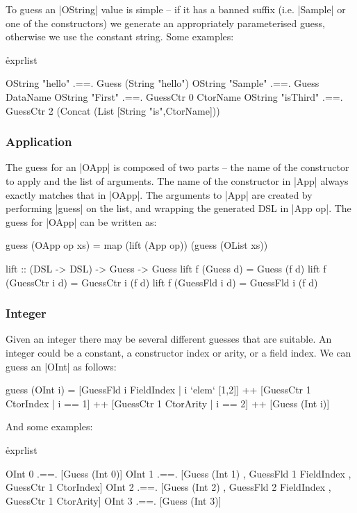 \documentclass[preprint,draft]{sigplanconf}
\begin{document}
To guess an |OString| value is simple -- if it has a banned suffix (i.e. |Sample| or one of the constructors) we generate an appropriately parameterised guess, otherwise we use the constant string. Some examples:

\h{exprlist}\begin{code}
OString "hello" .==. Guess (String "hello")
OString "Sample" .==. Guess DataName
OString "First" .==. GuessCtr 0 CtorName
OString "isThird" .==. GuessCtr 2
    (Concat (List [String "is",CtorName]))
\end{code}

\subsubsection{Application}

The guess for an |OApp| is composed of two parts -- the name of the constructor to apply and the list of arguments. The name of the constructor in |App| always exactly matches that in |OApp|. The arguments to |App| are created by performing |guess| on the list, and wrapping the generated DSL in |App op|. The guess for |OApp| can be written as:

\begin{code}
guess (OApp op xs) = map (lift (App op)) (guess (OList xs))

lift :: (DSL -> DSL) -> Guess -> Guess
lift f (Guess       d) = Guess       (f d)
lift f (GuessCtr i  d) = GuessCtr i  (f d)
lift f (GuessFld i  d) = GuessFld i  (f d)
\end{code}

\subsubsection{Integer}

Given an integer there may be several different guesses that are suitable. An integer could be a constant, a constructor index or arity, or a field index. We can guess an |OInt| as follows:

\begin{code}
guess (OInt i) =
    [GuessFld  i  FieldIndex  | i `elem` [1,2]] ++
    [GuessCtr  1  CtorIndex   | i == 1] ++
    [GuessCtr  1  CtorArity   | i == 2] ++
    [Guess (Int i)]
\end{code}

\noindent And some examples:

\h{exprlist}\begin{code}
OInt 0 .==. [Guess (Int 0)]
OInt 1 .==. [Guess (Int 1)  , GuessFld 1 FieldIndex
                            , GuessCtr 1 CtorIndex]
OInt 2 .==. [Guess (Int 2)  , GuessFld 2 FieldIndex
                            , GuessCtr 1 CtorArity]
OInt 3 .==. [Guess (Int 3)]
\end{code}
\end{document}
